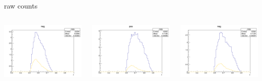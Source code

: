 \begin{frame}{raw counts}
\begin{columns}
\begin{column}[T]{0.25\textwidth}
\includegraphics[width = \textwidth]{results/yield/statistics/yield_x_Q2_z_0.50_5.500_0.60_neg.png}
\end{column}
\begin{column}[T]{0.25\textwidth}
\includegraphics[width = \textwidth]{results/yield/statistics/yield_x_Q2_z_0.50_5.500_0.70_pos.png}
\end{column}
\begin{column}[T]{0.25\textwidth}
\includegraphics[width = \textwidth]{results/yield/statistics/yield_x_Q2_z_0.50_5.500_0.70_neg.png}
\end{column}
\end{columns}
\end{frame}
